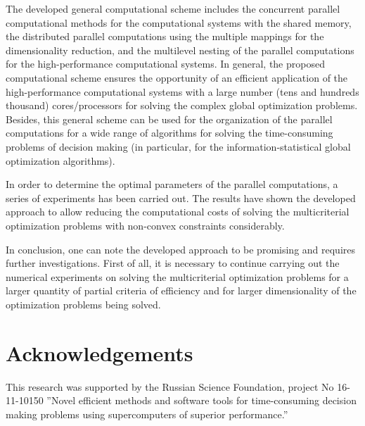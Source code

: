 \documentclass{svproc}
\begin{document}
The developed general computational scheme includes the concurrent parallel computational methods for the computational systems with the shared memory, the distributed parallel computations using the multiple mappings for the dimensionality reduction, and the multilevel nesting of the parallel computations for the high-performance computational systems. In general, the proposed computational scheme ensures the opportunity of an efficient application of the high-performance computational systems with a large number (tens and hundreds thousand) cores/processors for solving the complex global optimization problems. Besides, this general scheme can be used for the organization of the parallel computations for a wide range of algorithms for solving the time-consuming problems of decision making (in particular, for the information-statistical global optimization algorithms). 

In order to determine the optimal parameters of the parallel computations, a series of experiments has been carried out. The results have shown the developed approach to allow reducing the computational costs of solving the multicriterial optimization problems with non-convex constraints considerably.

In conclusion, one can note the developed approach to be promising and requires further investigations. First of all, it is necessary to continue carrying out the numerical experiments on solving the multicriterial optimization problems for a larger quantity of partial criteria of efficiency and for larger dimensionality of the optimization problems being solved. 

\section*{Acknowledgements}  
This research was supported by the Russian Science Foundation, project No 16-11-10150 ''Novel efficient methods and software tools for time-consuming decision making problems using supercomputers of superior performance.''
\end{document}
